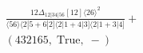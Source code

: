 \documentclass[varwidth, border=5pt]{standalone}
\begin{document}
\begin{my}
$\begin{gathered}
\scriptscriptstyle\frac{12Δ_{12|34|56}[12]⟨26⟩^2}{⟨56⟩⟨2|5+6|2]⟨2|1+4|3]⟨2|1+3|4]}+\\
\scriptscriptstyle(432165,\;\text{True},\;-)\phantom{+}
\end{gathered}$
\end{my}
\end{document}

